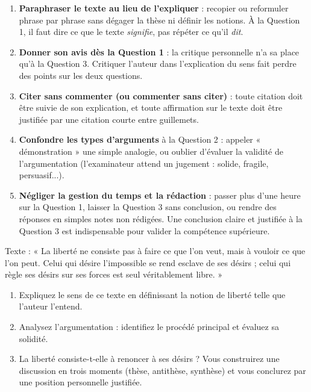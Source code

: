 \documentclass[11pt]{article}
\begin{document}
\begin{attention}
\begin{enumerate}
\item \textbf{Paraphraser le texte au lieu de l'expliquer} : recopier ou reformuler phrase par phrase sans dégager la thèse ni définir les notions. À la Question 1, il faut dire ce que le texte \emph{signifie}, pas répéter ce qu'il \emph{dit}.
\item \textbf{Donner son avis dès la Question 1} : la critique personnelle n'a sa place qu'à la Question 3. Critiquer l'auteur dans l'explication du sens fait perdre des points sur les deux questions.
\item \textbf{Citer sans commenter (ou commenter sans citer)} : toute citation doit être suivie de son explication, et toute affirmation sur le texte doit être justifiée par une citation courte entre guillemets.
\item \textbf{Confondre les types d'arguments} à la Question 2 : appeler « démonstration » une simple analogie, ou oublier d'évaluer la validité de l'argumentation (l'examinateur attend un jugement : solide, fragile, persuasif...).
\item \textbf{Négliger la gestion du temps et la rédaction} : passer plus d'une heure sur la Question 1, laisser la Question 3 sans conclusion, ou rendre des réponses en simples notes non rédigées. Une conclusion claire et justifiée à la Question 3 est indispensable pour valider la compétence supérieure.
\end{enumerate}
\end{attention}

\begin{exercice}
Texte : « La liberté ne consiste pas à faire ce que l'on veut, mais à vouloir ce que l'on peut. Celui qui désire l'impossible se rend esclave de ses désirs ; celui qui règle ses désirs sur ses forces est seul véritablement libre. »
\begin{enumerate}
\item Expliquez le sens de ce texte en définissant la notion de liberté telle que l'auteur l'entend.
\item Analysez l'argumentation : identifiez le procédé principal et évaluez sa solidité.
\item La liberté consiste-t-elle à renoncer à ses désirs ? Vous construirez une discussion en trois moments (thèse, antithèse, synthèse) et vous conclurez par une position personnelle justifiée.
\end{enumerate}
\end{exercice}
\end{document}
